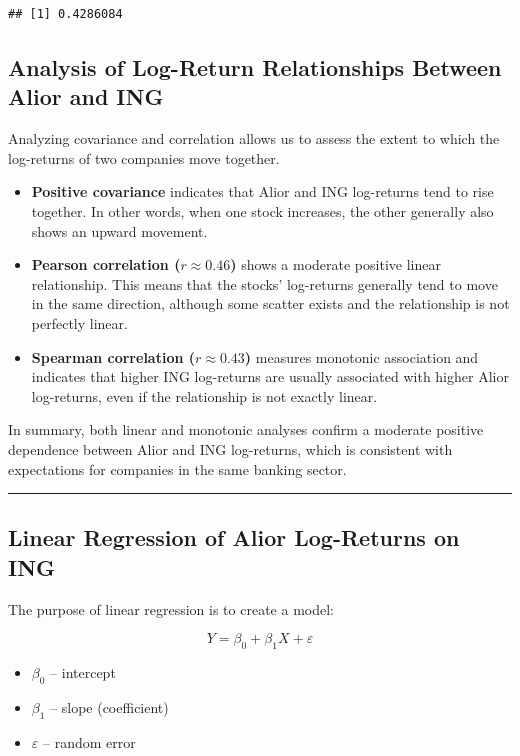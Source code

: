 \documentclass[
]{article}
\providecommand{\tightlist}{%
  \setlength{\itemsep}{0pt}\setlength{\parskip}{0pt}}
\begin{document}
\begin{verbatim}
## [1] 0.4286084
\end{verbatim}

\subsection{Analysis of Log-Return Relationships Between Alior and
ING}\label{analysis-of-log-return-relationships-between-alior-and-ing}

Analyzing covariance and correlation allows us to assess the extent to
which the log-returns of two companies move together.

\begin{itemize}
\item
  \textbf{Positive covariance} indicates that Alior and ING log-returns
  tend to rise together. In other words, when one stock increases, the
  other generally also shows an upward movement.
\item
  \textbf{Pearson correlation (\(r \approx 0.46\))} shows a moderate
  positive linear relationship. This means that the stocks' log-returns
  generally tend to move in the same direction, although some scatter
  exists and the relationship is not perfectly linear.
\item
  \textbf{Spearman correlation (\(r \approx 0.43\))} measures monotonic
  association and indicates that higher ING log-returns are usually
  associated with higher Alior log-returns, even if the relationship is
  not exactly linear.
\end{itemize}

In summary, both linear and monotonic analyses confirm a moderate
positive dependence between Alior and ING log-returns, which is
consistent with expectations for companies in the same banking sector.

\begin{center}\rule{0.5\linewidth}{0.5pt}\end{center}

\subsection{Linear Regression of Alior Log-Returns on
ING}\label{linear-regression-of-alior-log-returns-on-ing}

The purpose of linear regression is to create a model:

\[
Y = \beta_0 + \beta_1 X + \varepsilon
\]

\begin{itemize}
\tightlist
\item
  \(\beta_0\) -- intercept\\
\item
  \(\beta_1\) -- slope (coefficient)\\
\item
  \(\varepsilon\) -- random error
\end{itemize}
\end{document}
